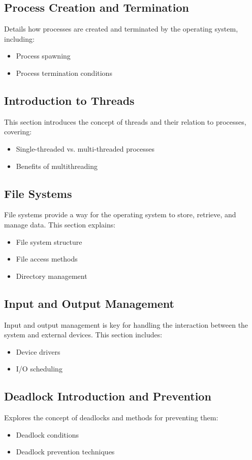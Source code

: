\documentclass[12pt]{article}
\begin{document}
	\subsection{Process Creation and Termination}
	Details how processes are created and terminated by the operating system, including:
	\begin{itemize}
		\item Process spawning
		\item Process termination conditions
	\end{itemize}
	
	\subsection{Introduction to Threads}
	This section introduces the concept of threads and their relation to processes, covering:
	\begin{itemize}
		\item Single-threaded vs. multi-threaded processes
		\item Benefits of multithreading
	\end{itemize}
	
	
	
	\subsection{File Systems}
	File systems provide a way for the operating system to store, retrieve, and manage data. This section explains:
	\begin{itemize}
		\item File system structure
		\item File access methods
		\item Directory management
	\end{itemize}
	
	\subsection{Input and Output Management}
	Input and output management is key for handling the interaction between the system and external devices. This section includes:
	\begin{itemize}
		\item Device drivers
		\item I/O scheduling
	\end{itemize}
	
	\subsection{Deadlock Introduction and Prevention}
	Explores the concept of deadlocks and methods for preventing them:
	\begin{itemize}
		\item Deadlock conditions
		\item Deadlock prevention techniques
	\end{itemize}
	
\end{document}
